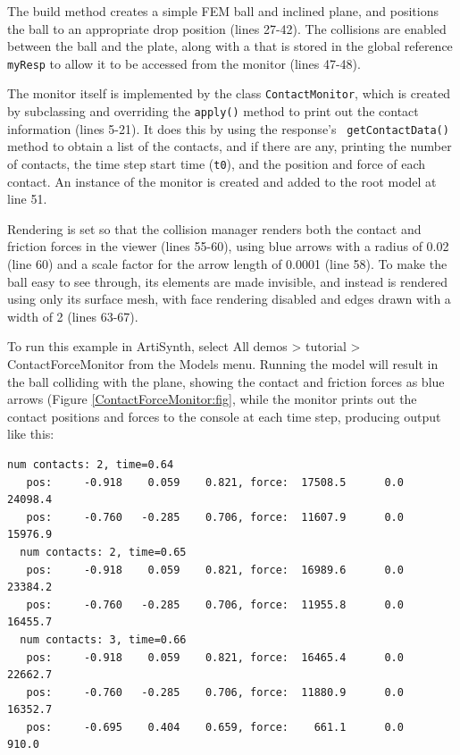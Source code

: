 \lstset{numbers=left} 
\iflatexml

\else

\fi
\lstset{numbers=none}

The build method creates a simple FEM ball and inclined plane, and
positions the ball to an appropriate drop position (lines 27-42).  The
collisions are enabled between the ball and the plate, along
with a 
that is stored in the global reference {\tt myResp} to allow it to be
accessed from the monitor (lines 47-48). 

The monitor itself is implemented by the class {\tt ContactMonitor},
which is created by subclassing
and overriding the {\tt apply()} method to print out the contact
information (lines 5-21). It does this by using the response's {\tt
getContactData()} method to obtain a list of the contacts, and if
there are any, printing the number of contacts, the time step start
time ({\tt t0}), and the position and force of each contact.  An
instance of the monitor is created and added to the root model at line
51.

Rendering is set so that the collision manager renders both the
contact and friction forces in the viewer (lines 55-60), using blue
arrows with a radius of 0.02 (line 60) and a scale factor for the
arrow length of 0.0001 (line 58). To make the ball easy to see
through, its elements are made invisible, and instead is rendered
using only its surface mesh, with face rendering disabled and edges
drawn with a width of 2 (lines 63-67).

To run this example in ArtiSynth, select {\sf All demos > tutorial >
ContactForceMonitor} from the {\sf Models} menu. Running the model
will result in the ball colliding with the plane, showing the contact
and friction forces as blue arrows
(Figure \ref{ContactForceMonitor:fig}, while the monitor prints out
the contact positions and forces to the console at each time step,
producing output like this:
%
\begin{lstlisting}[]
  num contacts: 2, time=0.64
   pos:     -0.918    0.059    0.821, force:  17508.5      0.0  24098.4
   pos:     -0.760   -0.285    0.706, force:  11607.9      0.0  15976.9
  num contacts: 2, time=0.65
   pos:     -0.918    0.059    0.821, force:  16989.6      0.0  23384.2
   pos:     -0.760   -0.285    0.706, force:  11955.8      0.0  16455.7
  num contacts: 3, time=0.66
   pos:     -0.918    0.059    0.821, force:  16465.4      0.0  22662.7
   pos:     -0.760   -0.285    0.706, force:  11880.9      0.0  16352.7
   pos:     -0.695    0.404    0.659, force:    661.1      0.0    910.0
\end{lstlisting}
%

